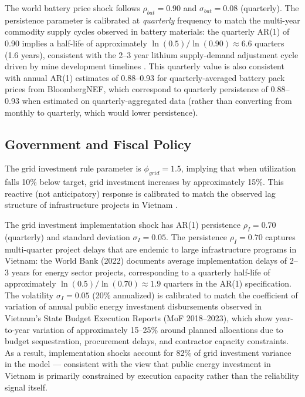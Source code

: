 \documentclass[12pt, a4paper]{article}
\begin{document}
The world battery price shock follows $\rho_{bat} = 0.90$ and $\sigma_{bat} = 0.08$ (quarterly). The persistence parameter is calibrated at \textit{quarterly} frequency to match the multi-year commodity supply cycles observed in battery materials: the quarterly AR(1) of 0.90 implies a half-life of approximately $\ln(0.5)/\ln(0.90) \approx 6.6$ quarters (1.6 years), consistent with the 2--3 year lithium supply-demand adjustment cycle driven by mine development timelines \citep{bloombergnef2023}. This quarterly value is also consistent with annual AR(1) estimates of 0.88--0.93 for quarterly-averaged battery pack prices from BloombergNEF, which correspond to quarterly persistence of 0.88--0.93 when estimated on quarterly-aggregated data (rather than converting from monthly to quarterly, which would lower persistence).

\subsection{Government and Fiscal Policy}

The grid investment rule parameter is $\phi_{grid} = 1.5$, implying that when utilization falls 10\% below target, grid investment increases by approximately 15\%. This reactive (not anticipatory) response is calibrated to match the observed lag structure of infrastructure projects in Vietnam \citep{worldbank2022}.

The grid investment implementation shock has AR(1) persistence $\rho_I = 0.70$ (quarterly) and standard deviation $\sigma_I = 0.05$. The persistence $\rho_I = 0.70$ captures multi-quarter project delays that are endemic to large infrastructure programs in Vietnam: the World Bank (2022) documents average implementation delays of 2--3 years for energy sector projects, corresponding to a quarterly half-life of approximately $\ln(0.5)/\ln(0.70) \approx 1.9$ quarters in the AR(1) specification. The volatility $\sigma_I = 0.05$ (20\% annualized) is calibrated to match the coefficient of variation of annual public energy investment disbursements observed in Vietnam's State Budget Execution Reports (MoF 2018--2023), which show year-to-year variation of approximately 15--25\% around planned allocations due to budget sequestration, procurement delays, and contractor capacity constraints. As a result, implementation shocks account for 82\% of grid investment variance in the model --- consistent with the view that public energy investment in Vietnam is primarily constrained by execution capacity rather than the reliability signal itself.
\end{document}
